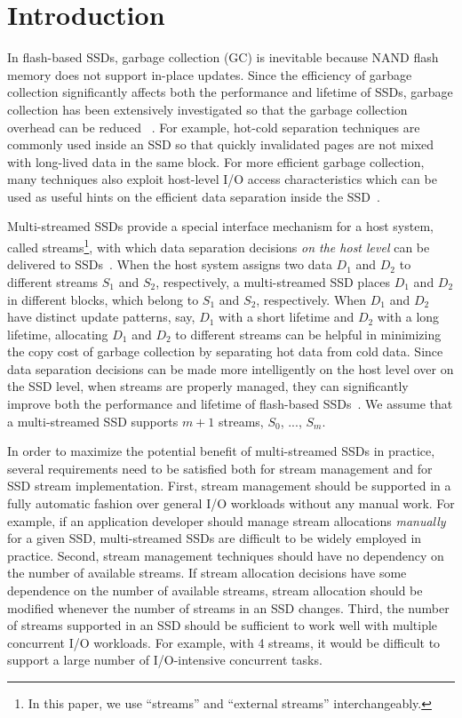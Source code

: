 \vspace{-12pt}
\section{Introduction}
\label{sec:intro}
\vspace{-4pt}
In flash-based SSDs, garbage collection (GC) is inevitable because NAND flash 
memory does not support in-place updates.  
Since the efficiency of garbage collection significantly affects  
both the performance and lifetime of SSDs, garbage collection has been extensively 
investigated so that the garbage collection overhead can be reduced
~\cite{DAC, WriteAmplification, GCGreedy, GCVictim, GCTTFlash, HotCold}.  
For example, hot-cold separation techniques are commonly used inside an SSD 
so that quickly invalidated pages are not mixed with long-lived data in the same block.   
For more efficient garbage collection, many techniques also exploit
host-level I/O access characteristics which can be used as useful hints on 
the efficient data separation inside the SSD~\cite{JiTGC, ShadowGC}.

Multi-streamed SSDs provide a special interface mechanism for 
a host system, called streams\footnote{In this paper, we use ``streams''
and ``external streams'' interchangeably.},
with which data separation decisions 
{\it on the host level} can be delivered to SSDs~\cite{T10, MultiStream}.  
When the host system assigns two data $D_1$ and $D_2$ to 
different streams $S_1$ and $S_2$, respectively, a multi-streamed SSD 
places $D_1$ and $D_2$ in different blocks, which belong to $S_1$ and $S_2$, respectively.
When $D_1$ and $D_2$ have distinct update patterns, say, $D_1$ with a short lifetime 
and $D_2$ with a long lifetime, allocating $D_1$ and $D_2$ to different streams 
can be helpful in minimizing the copy cost of
garbage collection by separating hot data from cold data.  
Since data separation decisions can be made more intelligently on the host level over on the SSD level, 
when streams are properly managed, they can significantly
improve both the performance and lifetime of 
flash-based SSDs~\cite{MultiStream, Level,vStream, FStream, AutoStream}.
We assume that a multi-streamed SSD supports $m+1$ streams, $S_0$, ..., $S_{m}$.

In order to maximize the potential benefit of multi-streamed
SSDs in practice, several requirements need to be satisfied both for 
stream management and for SSD stream implementation.
First, stream management should be supported in a fully automatic fashion 
over general I/O workloads without any manual work.
For example, if an
application developer should manage stream allocations {\it manually} for 
a given SSD, multi-streamed SSDs are difficult to be 
widely employed in practice.   
Second, stream management techniques should have no dependency on 
the number of available streams.  
If stream allocation decisions have some dependence on
the number of available streams,  
stream allocation should be modified
whenever the number of streams in an SSD changes.
Third, the number of streams supported in an SSD should be sufficient 
to work well with multiple concurrent I/O workloads.  
For example, with 4 streams, it would be difficult to support a large
number of I/O-intensive concurrent tasks.  

